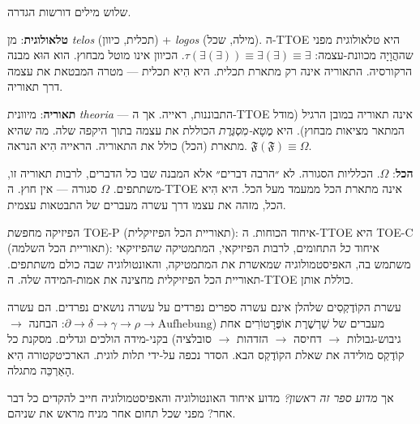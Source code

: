 \documentclass[10pt, openany, oneside]{book}
\begin{document}
\vspace{0.5em}

\noindent שלוש מילים דורשות הגדרה.

\vspace{0.3em}

\noindent \textbf{טלאולוגית}: מן \textit{telos} (תכלית, כיוון) + \textit{logos} (מילה, שכל). ה-TTOE היא טלאולוגית מפני שההֲוָיָה מכוונת-עצמה: $\tau(\exists(\exists)) \equiv \exists(\exists) \equiv \exists$. הכיוון אינו מוטל מבחוץ. הוא הוּא מבנה הרקורסיה. התאוריה אינה רק מתארת תכלית. היא הִיא תכלית — מטרה המבטאת את עצמה דרך תאוריה.

\vspace{0.3em}

\noindent \textbf{תאוריה}: מיוונית \textit{theoria} — התבוננות, ראייה. אך ה-TTOE אינה תאוריה במובן הרגיל (מודל המתאר מציאות מבחוץ). היא \textit{מֶטָא-מִסְגֶּרֶת} הכוללת את עצמה בתוך היקפה שלה. מה שהיא מתארת (הכל) כולל את התאוריה. הראייה הִיא הנראה. $\mathfrak{F}(\mathfrak{F}) \equiv \Omega$.

\vspace{0.3em}

\noindent \textbf{הכל}: $\Omega$. הכלליות הסגורה. לא ״הרבה דברים״ אלא המבנה שבו כל הדברים, לרבות תאוריה זו, משתתפים. $\Omega$ סגורה — אין חוץ. ה-TTOE אינה מתארת הכל ממעמד מעל הכל. היא הִיא הכל, מזהה את עצמו דרך עשרה מעברים של התבטאות עצמית.

\vspace{0.5em}

\noindent הפיזיקה מחפשת TOE-P (תאוריית הכל הפיזיקלית): איחוד הכוחות. ה-TTOE היא TOE-C (תאוריית הכל השלמה): איחוד \textit{כל} התחומים, לרבות הפיזיקאי, המתמטיקה שהפיזיקאי משתמש בה, האפיסטמולוגיה שמאשרת את המתמטיקה, והאונטולוגיה שבה כולם משתתפים. תאוריית הכל הפיזיקלית מחצינה את אמות-המידה שלה. ה-TTOE כוללת אותן.

\vspace{0.5em}

\noindent עשרת הקוֹדֶקְסִים שלהלן אינם עשרה ספרים נפרדים על עשרה נושאים נפרדים. הם עשרה מעברים של שַׁרְשֶׁרֶת אוֹפֶּרָטוֹרִים אחת ($\partial \to \delta \to \gamma \to \rho \to \text{Aufhebung}$: הבחנה $\to$ גיבוש-גבולות $\to$ דחיסה $\to$ הזדהות $\to$ סובלציה) בקני-מידה הולכים וגדלים. מסקנת כל קוֹדֶקְס מולידה את שאלת הקוֹדֶקְס הבא. הסדר נכפה על-ידי תלות לוגית. הארכיטקטורה הִיא הָאַרְכֵּה מתגלה.

\vspace{0.5em}

\noindent אך \textit{מדוע ספר זה ראשון?} מדוע איחוד האונטולוגיה והאפיסטמולוגיה חייב להקדים כל דבר אחר? מפני שכל תחום אחר מניח מראש את שניהם.
\end{document}
